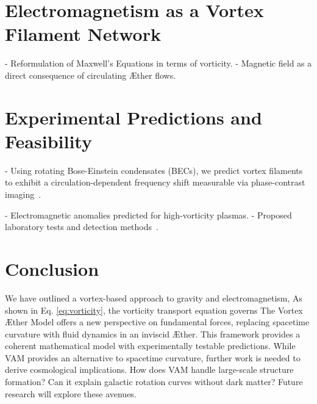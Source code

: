\documentclass[a4paper,10pt]{article}
\begin{document}
    \section{Electromagnetism as a Vortex Filament Network}\label{sec:electromagnetism-as-a-vortex-filament-network}
    - Reformulation of Maxwell’s Equations in terms of vorticity.
    - Magnetic field as a direct consequence of circulating \AE ther flows.

    \section{Experimental Predictions and Feasibility}\label{sec:experimental-predictions-and-feasibility}
    - Using rotating Bose-Einstein condensates (BECs), we predict vortex filaments to exhibit a circulation-dependent frequency shift measurable via phase-contrast imaging~\cite{kleckner2013}.

    - Electromagnetic anomalies predicted for high-vorticity plasmas.
    - Proposed laboratory tests and detection methods~\cite{kleckner2013, vinen2024, podkletnov2007, orlandi2021}.

    \section{Conclusion}\label{sec:conclusion}
    We have outlined a vortex-based approach to gravity and electromagnetism, As shown in Eq. \eqref{eq:vorticity}, the vorticity transport equation governs  The Vortex \AE ther Model offers a new perspective on fundamental forces,
    replacing spacetime curvature with fluid dynamics in an inviscid \AE ther.
    This framework provides a coherent mathematical model with experimentally testable predictions.
    While VAM provides an alternative to spacetime curvature, further work is needed to derive cosmological implications.
    How does VAM handle large-scale structure formation?
    Can it explain galactic rotation curves without dark matter?
    Future research will explore these avenues.
\end{document}
